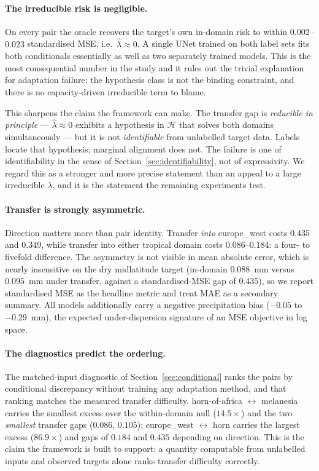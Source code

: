 \documentclass{article}
\begin{document}
\paragraph{The irreducible risk is negligible.}
On every pair the oracle recovers the target's own in-domain risk to
within $0.002$--$0.023$ standardised MSE, i.e.\ $\widehat{\lambda}
\approx 0$. A single UNet trained on both label sets fits both
conditionals essentially as well as two separately trained models. This
is the most consequential number in the study and it rules out the
trivial explanation for adaptation failure: the hypothesis class is not
the binding constraint, and there is no capacity-driven irreducible
term to blame.

This sharpens the claim the framework can make. The transfer gap is
\emph{reducible in principle} --- $\widehat{\lambda}\approx 0$ exhibits
a hypothesis in $\mathcal{H}$ that solves both domains simultaneously
--- but it is not \emph{identifiable} from unlabelled target data.
Labels locate that hypothesis; marginal alignment does not. The failure
is one of identifiability in the sense of
Section~\ref{sec:identifiability}, not of expressivity. We regard this
as a stronger and more precise statement than an appeal to a large
irreducible $\lambda$, and it is the statement the remaining
experiments test.

\paragraph{Transfer is strongly asymmetric.}
Direction matters more than pair identity. Transfer \emph{into}
europe\_west costs $0.435$ and $0.349$, while transfer into either
tropical domain costs $0.086$--$0.184$: a four- to fivefold difference.
The asymmetry is not visible in mean absolute error, which is nearly
insensitive on the dry midlatitude target (in-domain $0.088$~mm versus
$0.095$~mm under transfer, against a standardised-MSE gap of $0.435$),
so we report standardised MSE as the headline metric and treat MAE as a
secondary summary. All models additionally carry a negative
precipitation bias ($-0.05$ to $-0.29$~mm), the expected
under-dispersion signature of an MSE objective in log space.

\paragraph{The diagnostics predict the ordering.}
The matched-input diagnostic of Section~\ref{sec:conditional} ranks the
pairs by conditional discrepancy without training any adaptation
method, and that ranking matches the measured transfer difficulty.
horn-of-africa $\leftrightarrow$ melanesia carries the smallest excess
over the within-domain null ($14.5\times$) and the two \emph{smallest}
transfer gaps ($0.086$, $0.105$); europe\_west $\leftrightarrow$ horn
carries the largest excess ($86.9\times$) and gaps of $0.184$ and
$0.435$ depending on direction. This is the claim the framework is
built to support: a quantity computable from unlabelled inputs and
observed targets alone ranks transfer difficulty correctly.
\end{document}
